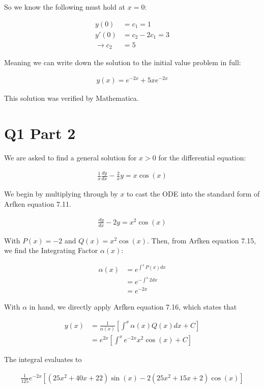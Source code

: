 \documentclass[paper=a4, fontsize=11pt]{scrartcl} %
\numberwithin{equation}{section} %
\numberwithin{figure}{section} %
\numberwithin{table}{section} %
\begin{document}
So we know the following must hold at $x=0$:

\begin{align}
y(0) &= c_1 = 1\\ 
y'(0) &= c_2 - 2c_1 = 3 \\
\rightarrow c_2 &= 5
\end{align}

Meaning we can write down the solution to the initial value problem in full:

\begin{align}
y(x) = e^{-2x} + 5x e^{-2x}
\end{align}

This solution was verified by Mathematica. \checkmark

\section{Q1 Part 2}
We are asked to find a general solution for $x > 0$ for the differential equation:

\begin{align}
\frac{1}{x}\frac{dy}{dx} - \frac{2}{x} y = x \cos(x)
\end{align}

We begin by multiplying through by $x$ to cast the ODE into the standard form of Arfken equation 7.11.

\begin{align}
\frac{dy}{dx} - 2y = x^2 \cos(x)
\end{align}

With $P(x) = -2$ and $Q(x) = x^2 \cos(x)$. Then, from Arfken equation 7.15, we find the Integrating Factor $\alpha(x)$:

\begin{align}
\alpha(x) &= e^{\int^{x} P(x) dx} \\
&= e^{-\int^{x} 2 dx} \\
&= e^{- 2x}
\end{align}

With $\alpha$ in hand, we directly apply Arfken equation 7.16, which states that 

\begin{align}
y(x) &= \frac{1}{\alpha(x)} \left[ \int^{x} \alpha(x) Q(x) dx + C \right] \\
&= e^{2x} \left[ \int^{x} e^{-2x}x^2\cos(x) + C \right]
\end{align}

The integral evaluates to

\begin{align}
\frac{1}{125} e^{-2 x} \left[\left(25 x^2+40 x+22\right) \sin(x) -2 \left(25 x^2+15 x+2\right) \cos(x) \right]
\end{align}
\end{document}
